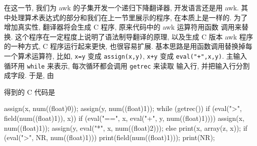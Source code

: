 在这一节, 我们为 awk 的子集开发一个递归下降翻译器, 开发语言还是用 awk.
其中处理算术表达式的部分和我们在上一节里展示的程序, 在本质上是一样的.
为了增加真实性, 翻译器将会生成 C 程序, 原来代码中的 awk 运算符用函数
调用来替换. 这个程序在一定程度上说明了语法制导翻译的原理, 以及生成
C 版本 awk 程序的一种方式, C 程序运行起来更快, 也很容易扩展.
基本思路是用函数调用替换掉每一个算术运算符, 比如, \texttt{x=y} 变成
\texttt{assign(x,y)}, \texttt{x+y} 变成 \texttt{eval("+",x,y)}. 主输入
循环用 \texttt{while} 来表示, 每次循环都会调用 \texttt{getrec} 来读取
输入行, 并把输入行分割成字段. 于是, 由
得到的 C 代码是
\begin{awkcode}
    assign(x, num((float)0));
    assign(y, num((float)1));
    while (getrec()) {
            if (eval(">", field(num((float)1)), x)) {
                    if (eval("==", x, eval("+", y, num((float)1)))) {
                            assign(x, num((float)1));
                            assign(y, eval("*", x, num((float)2)));
                    } else {
                            print(x, array(z, x));
                    }
            }
            if (eval(">", NR, num((float)1))) {
                    print(field(num((float)1)));
            }
    }
    print(NR);
\end{awkcode}

